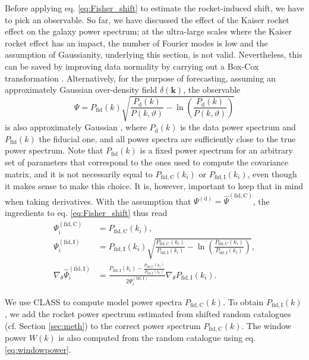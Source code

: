 \documentclass[a4paper,11pt]{article}
\begin{document}
Before applying eq. \eqref{eq:Fisher_shift} to estimate the rocket-induced shift, 
we have to pick an observable. So far, we have discussed the effect of the Kaiser rocket effect on the galaxy power spectrum; at the ultra-large scales where the Kaiser rocket effect has an impact, the number of Fourier modes is low and the assumption of Gaussianity, underlying this section, is not valid. Nevertheless, this can be saved by improving data normality by carrying out a Box-Cox transformation \cite{BoxCox,Joachimi:2011iq,Schuhmann:2015dma,Mike:2018zvb}. Alternatively, for the purpose of forecasting, assuming an approximately Gaussian over-density field $\delta(\mathbf{k})$, the observable 
\begin{equation}
    \Psi = P_\mathrm{fid}(k)\sqrt{\frac{P_\mathrm{d}(k)}{P(k, \vartheta)}-\ln\left(\frac{P_\mathrm{d}(k)}{P(k, \vartheta)}\right)}
\end{equation}
is also approximately Gaussian \cite*{Hamimeche:2008ai,Kalus:2015lna}, where $P_\mathrm{d}(k)$ is the data power spectrum and $P_\mathrm{fid}(k)$ the fiducial one, and all power spectra are sufficiently close to the true power spectrum. Note that $P_\mathrm{fid}(k)$ is a fixed power spectrum for an arbitrary set of parameters that correspond to the ones used to compute the covariance matrix, and it is not necessarily equal to $P_\mathrm{fid, C}(k_i)$ or $P_\mathrm{fid, I}(k_i)$, even though it makes sense to make this choice. It is, however, important to keep that in mind when taking derivatives. With the  assumption that $\Psi^\mathrm{(d)} = \hat\Psi^\mathrm{(fid, C)}$, the ingredients to eq. \eqref{eq:Fisher_shift} thus read
\begin{align}
    \Psi^\mathrm{(fid, C)}_i &= P_\mathrm{fid, C}(k_i),\nonumber\\
    \Psi^\mathrm{(fid, I)}_i &= P_\mathrm{fid, I}(k_i)\sqrt{\frac{P_\mathrm{fid, C}(k_i)}{P_\mathrm{fid, I}(k_i)}-\ln\left(\frac{P_\mathrm{fid, C}(k_i)}{P_\mathrm{fid, I}(k_i)}\right)},\nonumber\\
    \nabla_\theta \hat\Psi_i^\mathrm{(fid, I)} &= \frac{P_\mathrm{fid, I}(k_i) - \frac{P_\mathrm{fid, C}(k_i)}{P_\mathrm{fid, I}(k_i)}}{2\Psi^\mathrm{(fid, I)}_i}\nabla_\theta P_\mathrm{fid, I}(k_i).
    \label{eq:GaussianisedPower}
\end{align}
    
We use CLASS \cite{Blas:2011rf,DiDio_Classgal} to compute model power spectra $P_\mathrm{fid, C}(k)$. To obtain $P_\mathrm{fid, I}(k)$, we add the rocket power spectrum estimated from shifted random catalogues (cf. Section \ref{sec:meth}) to the correct power spectrum $P_\mathrm{fid, C}(k)$. The window power $W(k)$ is also computed from the random catalogue using eq. \eqref{eq:windowpower}.
\end{document}
